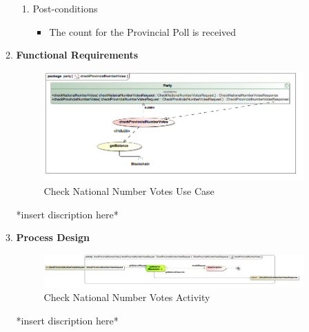 \begin{enumerate}
\begin{enumerate}
\begin{enumerate}
				\item Post-conditions
				\begin{itemize}
					\item The count for the Provincial Poll is received
				\end{itemize}
			\end{enumerate}
			
			\item \textbf{Functional Requirements}
			\begin{figure}[H]
				\centering
				\includegraphics[width=0.75\linewidth]{../Images/Party/UseCases/CheckProvincialNumberVotes_UseCase.png}
				\caption{Check National Number Votes Use Case}
			\end{figure}
			
			*insert discription here*
			\newline
			
			\item \textbf{Process Design}
			\begin{figure}[H]
				\centering
				\includegraphics[width=0.75\linewidth]{../Images/Party/ActivityDiagrams/CheckProvincialNumberVotes_Activity.png}
				\caption{Check National Number Votes Activity}
			\end{figure}
			
			*insert discription here*
			\newline
		\end{enumerate}
\end{enumerate}